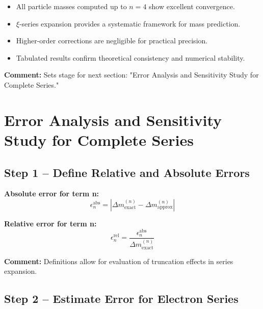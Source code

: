 \documentclass[12pt,a4paper]{article}
\begin{document}
\begin{itemize}
	\item All particle masses computed up to $n=4$ show excellent convergence.
	\item $\xi$-series expansion provides a systematic framework for mass prediction.
	\item Higher-order corrections are negligible for practical precision.
	\item Tabulated results confirm theoretical consistency and numerical stability.
\end{itemize}

\textbf{Comment:} Sets stage for next section: "Error Analysis and Sensitivity Study for Complete Series."

\section{Error Analysis and Sensitivity Study for Complete Series}

\subsection{Step 1 – Define Relative and Absolute Errors}

\textbf{Absolute error for term n:}
\begin{equation}
	\epsilon_n^\text{abs} = |\Delta m^{(n)}_\text{exact} - \Delta m^{(n)}_\text{approx}|
\end{equation}

\textbf{Relative error for term n:}
\begin{equation}
	\epsilon_n^\text{rel} = \frac{\epsilon_n^\text{abs}}{\Delta m^{(n)}_\text{exact}}
\end{equation}

\textbf{Comment:} Definitions allow for evaluation of truncation effects in series expansion.

\subsection{Step 2 – Estimate Error for Electron Series}
\end{document}
